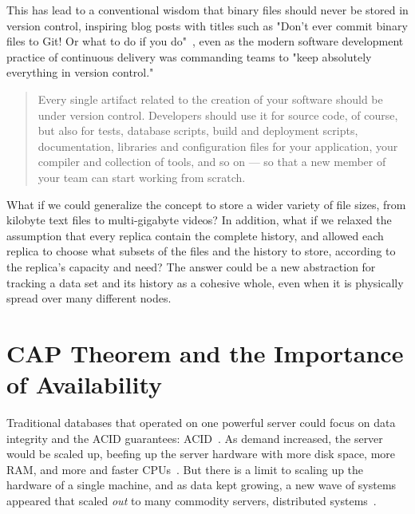 This has lead to a conventional wisdom that binary files should never be stored
in version control, inspiring blog posts with titles such as "Don't ever commit
binary files to Git! Or what to do if you
do"~\cite{dont_ever_commit_binaries_to_version_control}, even as the modern
software development practice of continuous delivery was commanding teams to
"keep absolutely everything in version
control."~\cite[p.33]{continuousdeliverybook}

\blockcquote[p.33]{continuousdeliverybook}{
    Every single artifact related to the creation of your software should be
    under version control. Developers should use it for source code, of course,
    but also for tests, database scripts, build and deployment scripts,
    documentation, libraries and configuration files for your application, your
    compiler and collection of tools, and so on --- so that a new member of your
    team can start working from scratch.
}

What if we could generalize the 
concept to store a wider variety of file sizes, from kilobyte text files to
multi-gigabyte videos? In addition, what if we relaxed the assumption that every
replica contain the complete history, and allowed each replica to choose what
subsets of the files and the history to store, according to the replica's
capacity and need? The answer could be a new abstraction for tracking a data set
and its history as a cohesive whole, even when it is physically spread over many
different nodes.

%



\section{CAP Theorem and the Importance of Availability}


Traditional databases that operated on one powerful server could focus on data
integrity and the \acrshort{ACID} guarantees: \acrlong{ACID}~\cite[Chapter
1]{nosqldistilled}. As demand increased, the server would be scaled up, beefing
  up the server hardware with more disk space, more RAM, and more and faster
  CPUs~\cite[Chapter 4]{nosqldistilled}. But there is a limit to scaling up the
  hardware of a single machine, and as data kept growing, a new wave of systems
  appeared that scaled \emph{out} to many commodity servers, distributed
  systems~\cite[Chapter 4]{nosqldistilled}.


